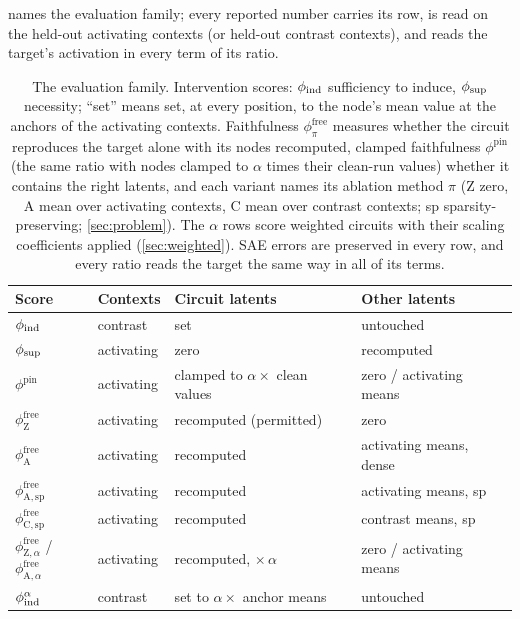 \documentclass[10pt]{article}
\begin{document}
 names the evaluation family; every reported number carries its row, is read on the held-out activating contexts (or held-out contrast contexts), and reads the target's activation in every term of its ratio.

\begin{table}[h]
\centering
\small
\setlength{\tabcolsep}{5pt}
\begin{tabular}{llll}
\toprule
\textbf{Score} & \textbf{Contexts} & \textbf{Circuit latents} & \textbf{Other latents} \\
\midrule
$\phi_{\mathrm{ind}}$             & contrast   & set                        & untouched \\
$\phi_{\mathrm{sup}}$             & activating & zero                       & recomputed \\
$\phi^{\mathrm{pin}}$ & activating & clamped to $\alpha \times$ clean values & zero / activating means \\
$\phi^{\mathrm{free}}_{\mathrm{Z}}$ & activating & recomputed (permitted) & zero \\
$\phi^{\mathrm{free}}_{\mathrm{A}}$ & activating & recomputed & activating means, dense \\
$\phi^{\mathrm{free}}_{\mathrm{A},\mathrm{sp}}$ & activating & recomputed & activating means, sp \\
$\phi^{\mathrm{free}}_{\mathrm{C},\mathrm{sp}}$ & activating & recomputed & contrast means, sp \\
$\phi^{\mathrm{free}}_{\mathrm{Z},\alpha}$ / $\phi^{\mathrm{free}}_{\mathrm{A},\alpha}$ & activating & recomputed, $\times\,\alpha$ & zero / activating means \\
$\phi_{\mathrm{ind}}^{\alpha}$    & contrast   & set to $\alpha \times$ anchor means & untouched \\
\bottomrule
\end{tabular}
\caption{The evaluation family.
Intervention scores: $\phi_{\mathrm{ind}}$ sufficiency to induce, $\phi_{\mathrm{sup}}$ necessity; ``set'' means set, at every position, to the node's mean value at the anchors of the activating contexts.
Faithfulness $\phi^{\mathrm{free}}_{\pi}$ measures whether the circuit reproduces the target alone with its nodes recomputed, clamped faithfulness $\phi^{\mathrm{pin}}$ (the same ratio with nodes clamped to $\alpha$ times their clean-run values) whether it contains the right latents, and each variant names its ablation method $\pi$ (Z zero, A mean over activating contexts, C mean over contrast contexts; sp sparsity-preserving; \cref{sec:problem}).
The $\alpha$ rows score weighted circuits with their scaling coefficients applied (\cref{sec:weighted}).
SAE errors are preserved in every row, and every ratio reads the target the same way in all of its terms.}
\label{tab:semantics}
\end{table}
\end{document}

